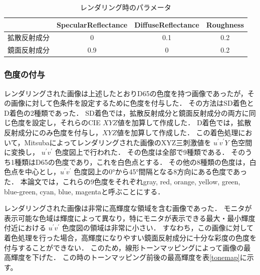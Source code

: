                 \begin{table}[h]
                    \centering
                    \caption{レンダリング時のパラメータ}
                    \begin{tabular}{|l||c|c|c|} \hline
                                            & SpecularReflectance & DiffuseReflectance & Roughness \\ \hline \hline
                        拡散反射成分           & 0                   & 0.1                & 0.2 \\ \hline
                        鏡面反射成分           & 0.9                 & 0                  & 0.2 \\ \hline
                    \end{tabular}
                    \label{render_param}
                \end{table}
            
            \subsubsection{色度の付与}

                レンダリングされた画像は上述したとおりD65の色度を持つ画像であったが，その画像に対して色条件を設定するために色度を付与した．
                その方法はSD着色とD着色の2種類であった．
                SD着色では，拡散反射成分と鏡面反射成分の両方に同じ色度を設定し，それらのCIE $XYZ$値を加算して作成した．
                D着色では，拡散反射成分にのみ色度を付与し，$XYZ$値を加算して作成した．
                この着色処理において，Mitsubaによってレンダリングされた画像のXYZ三刺激値を $u^{\prime}v^{\prime}Y$ 色空間に変換し， $u^{\prime}v^{\prime}$ 色度図上で行われた．
                その色度は全部で9種類である．
                そのうち1種類はD65の色度であり，これを白色点とする．
                その他の8種類の色度は，白色点を中心とし，$u^{\prime}v^{\prime}$ 色度図上の0°から45°間隔となる8方向にある色度であった．
                本論文では，これらの9色度をそれぞれgray, red, orange, yellow, green, blue-green, cyan, blue, magentaと呼ぶことにする．

                レンダリングされた画像は非常に高輝度な領域を含む画像であった．
                モニタが表示可能な色域は輝度によって異なり，特にモニタが表示できる最大・最小輝度付近における $u^{\prime}v^{\prime}$ 色度図の領域は非常に小さい．
                すなわち，この画像に対して着色処理を行った場合，高輝度になりやすい鏡面反射成分に十分な彩度の色度を付与することができない．
                このため，線形トーンマッピングによって画像の最高輝度を下げた．
                この時のトーンマッピング前後の最高輝度を表\ref{tonemap}に示す。

